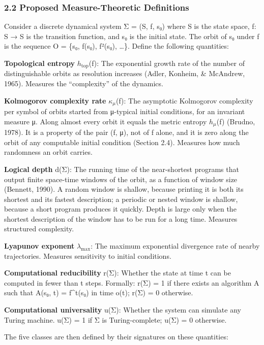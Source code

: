 \documentclass[
]{article}
\begin{document}
\hypertarget{proposed-measure-theoretic-definitions}{%
\subsubsection{2.2 Proposed Measure-Theoretic
Definitions}\label{proposed-measure-theoretic-definitions}}

Consider a discrete dynamical system Σ = (S, f, s₀) where S is the state
space, f: S → S is the transition function, and s₀ is the initial state.
The orbit of s₀ under f is the sequence O = \{s₀, f(s₀), f²(s₀),
\ldots\}. Define the following quantities:

\textbf{Topological entropy} \(h_{\mathrm{top}}\)(f): The exponential
growth rate of the number of distinguishable orbits as resolution
increases (Adler, Konheim, \& McAndrew, 1965). Measures the
``complexity'' of the dynamics.

\textbf{Kolmogorov complexity rate} \(\kappa_{\mu}\)(f): The asymptotic
Kolmogorov complexity per symbol of orbits started from μ-typical
initial conditions, for an invariant measure μ. Along almost every orbit
it equals the metric entropy \(h_{\mu}\)(f) (Brudno, 1978). It is a
property of the pair (f, μ), not of f alone, and it is zero along the
orbit of any computable initial condition (Section 2.4). Measures how
much randomness an orbit carries.

\textbf{Logical depth} d(Σ): The running time of the near-shortest
programs that output finite space-time windows of the orbit, as a
function of window size (Bennett, 1990). A random window is shallow,
because printing it is both its shortest and its fastest description; a
periodic or nested window is shallow, because a short program produces
it quickly. Depth is large only when the shortest description of the
window has to be run for a long time. Measures structured complexity.

\textbf{Lyapunov exponent} \(\lambda_{\max}\): The maximum exponential
divergence rate of nearby trajectories. Measures sensitivity to initial
conditions.

\textbf{Computational reducibility} r(Σ): Whether the state at time t
can be computed in fewer than t steps. Formally: r(Σ) = 1 if there
exists an algorithm A such that A(s₀, t) = f\^{}t(s₀) in time o(t); r(Σ)
= 0 otherwise.

\textbf{Computational universality} u(Σ): Whether the system can
simulate any Turing machine. u(Σ) = 1 if Σ is Turing-complete; u(Σ) = 0
otherwise.

The five classes are then defined by their signatures on these
quantities:
\end{document}
